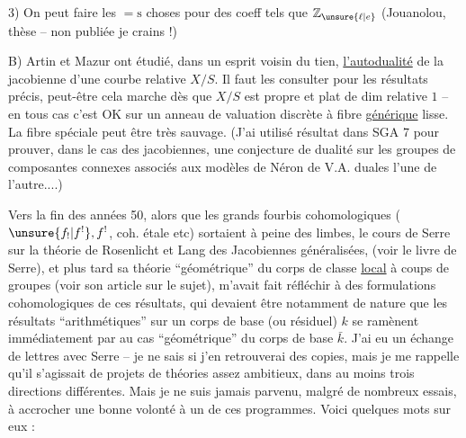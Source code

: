 3) On peut faire les ${=}\mathrm{s}$ choses pour des coeff tels que $\mathbb{Z}_{\unsure{\ell|e}}$ (Jouanolou, thèse -- non publiée je crains !)


B) Artin et Mazur ont étudié, dans un esprit voisin du tien, \uline{l'autodualité} de la jacobienne d'une courbe relative $X/S$. Il faut les consulter pour les résultats précis, peut-être cela marche dès que $X/S$ est propre et plat de dim relative $1$ -- en tous cas c'est OK sur un anneau de valuation discrète à fibre \uline{générique} lisse. La fibre spéciale peut être très sauvage. (J'ai utilisé  résultat dans SGA 7 pour prouver, dans le cas des jacobiennes, une conjecture de dualité sur les groupes de composantes connexes associés aux  modèles de Néron de V.A. duales l'une de l'autre....)


 Vers la fin des années 50, alors que les grands fourbis cohomologiques ($\unsure{f_{!}|f^{!}},f^{!}$, coh. étale etc) sortaient à peine des limbes, le cours de Serre sur la théorie de Rosenlicht et Lang des Jacobiennes
généralisées,  (voir le livre de Serre), et plus tard sa théorie ``géométrique'' du corps de classe \uline{local} à coups de groupes  (voir son article sur le sujet), m'avait fait réfléchir à des formulations cohomologiques de ces résultats, qui devaient être notamment de nature  que les résultats ``arithmétiques'' sur un corps de base (ou résiduel) $k$  se ramènent immédiatement par  au cas ``géométrique'' du corps de base $\bar{k}$. J'ai eu un échange de lettres avec Serre -- je ne sais si j'en retrouverai des copies, mais je me rappelle qu'il s'agissait de projets de théories assez ambitieux,  dans au moins trois directions différentes. Mais je ne suis jamais parvenu, malgré de nombreux essais, à accrocher une bonne volonté à un de ces programmes. Voici quelques mots sur eux :

